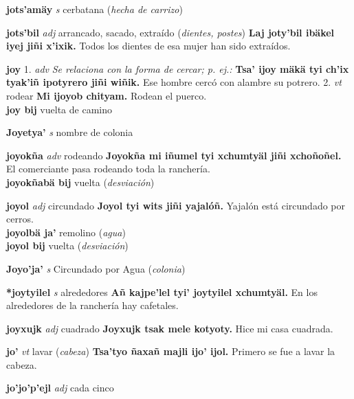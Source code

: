 \documentclass[10pt]{scrbook}
\newcommand{\entry}[1]{\textbf{#1}}
\newcommand{\onedefinition}[1]{#1.}
\newcommand{\nontranslationdef}[1]{\textit{#1}}
\newcommand{\partofspeech}[1]{\textit{#1}}
\newcommand{\spanishtranslation}[1]{#1}
\newcommand{\clarification}[1]{(\textit{#1})}
\newcommand{\cholexample}[1]{\textbf{#1}}
\newcommand{\exampletranslation}[1]{#1}
\newcommand{\secondaryentry}[1]{\\\textbf{#1}}
\newcommand{\secondtranslation}[1]{#1}
\begin{document}
\begin{multicols}{2}
\entry{jots'amäy}
\partofspeech{s}
\spanishtranslation{cerbatana}
\clarification{hecha de carrizo}

\entry{jots'bil}
\partofspeech{adj}
\spanishtranslation{arrancado, sacado, extraído}
\clarification{dientes, postes}
\cholexample{Laj joty'bil ibäkel iyej jiñi x'ixik.}
\exampletranslation{Todos los dientes de esa mujer han sido extraídos.}

\entry{joy}
\onedefinition{1}
\partofspeech{adv}
\nontranslationdef{Se relaciona con la forma de cercar; p. ej.:}
\cholexample{Tsa' ijoy mäkä tyi ch'ix tyak'iñ ipotyrero jiñi wiñik.}
\exampletranslation{Ese hombre cercó con alambre su potrero.}
\onedefinition{2}
\partofspeech{vt}
\spanishtranslation{rodear}
\cholexample{Mi ijoyob chityam.}
\exampletranslation{Rodean el puerco.}
\secondaryentry{joy bij}
\secondtranslation{vuelta de camino}

\entry{Joyetya'}
\partofspeech{s}
\spanishtranslation{nombre de colonia}

\entry{joyokña}
\partofspeech{adv}
\spanishtranslation{rodeando}
\cholexample{Joyokña mi iñumel tyi xchumtyäl jiñi xchoñoñel.}
\exampletranslation{El comerciante pasa rodeando toda la ranchería.}
\secondaryentry{joyokñabä bij}
\secondtranslation{vuelta}
\clarification{desviación}

\entry{joyol}
\partofspeech{adj}
\spanishtranslation{circundado}
\cholexample{Joyol tyi wits jiñi yajalóñ.}
\exampletranslation{Yajalón está circundado por cerros.}
\secondaryentry{joyolbä ja'}
\secondtranslation{remolino}
\clarification{agua}
\secondaryentry{joyol bij}
\secondtranslation{vuelta}
\clarification{desviación}

\entry{Joyo'ja'}
\partofspeech{s}
\spanishtranslation{Circundado por Agua}
\clarification{colonia}

\entry{*joytyilel}
\partofspeech{s}
\spanishtranslation{alrededores}
\cholexample{Añ kajpe'lel tyi' joytyilel xchumtyäl.}
\exampletranslation{En los alrededores de la ranchería hay cafetales.}

\entry{joyxujk}
\partofspeech{adj}
\spanishtranslation{cuadrado}
\cholexample{Joyxujk tsak mele kotyoty.}
\exampletranslation{Hice mi casa cuadrada.}

\entry{jo'}
\partofspeech{vt}
\spanishtranslation{lavar}
\clarification{cabeza}
\cholexample{Tsa'tyo ñaxañ majli ijo' ijol.}
\exampletranslation{Primero se fue a lavar la cabeza.}

\entry{jo'jo'p'ejl}
\partofspeech{adj}
\spanishtranslation{cada cinco}


\end{multicols}
\end{document}
